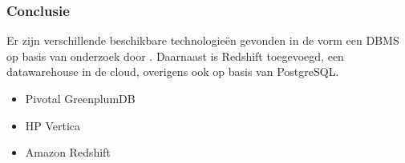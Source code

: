 \subsubsection{\textbf{Conclusie}}

Er zijn verschillende beschikbare technologieën gevonden in de vorm een DBMS op basis van onderzoek door \textcite{dewitt2006build}. Daarnaast is Redshift toegevoegd, een datawarehouse in de cloud, overigens ook op basis van PostgreSQL.


\begin{itemize}
    \item Pivotal GreenplumDB
    \item HP Vertica
    \item Amazon Redshift
\end{itemize}

